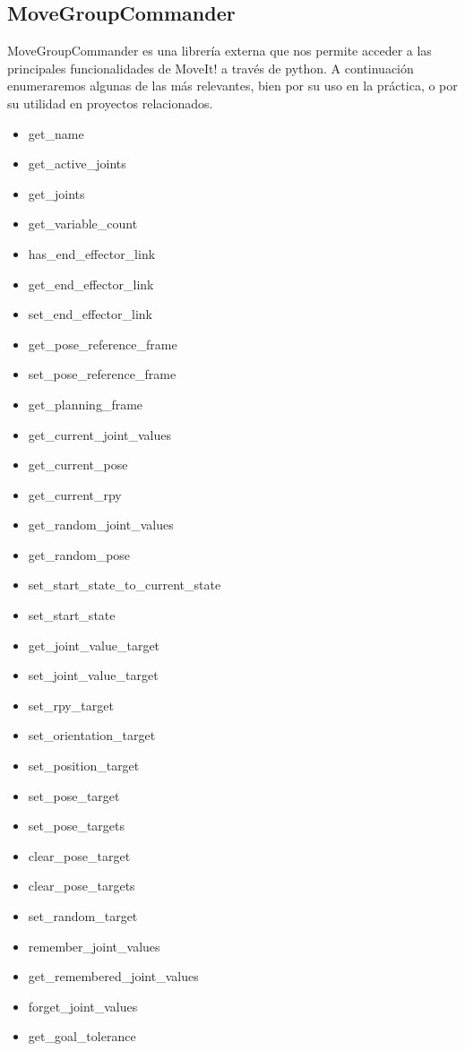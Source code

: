 \documentclass[12pt,spanish,chapterprefix, numbers=noenddot]{book}
\numberwithin{equation}{section}
\numberwithin{figure}{section}
\begin{document}
\subsection{MoveGroupCommander}
MoveGroupCommander es una librería externa que nos permite acceder a las principales funcionalidades de MoveIt! a través de python. A continuación enumeraremos algunas de las más relevantes, bien por su uso en la práctica, o por su utilidad en proyectos relacionados. 
\begin{itemize}
\item get\_name
\item get\_active\_joints
\item get\_joints
\item get\_variable\_count
\item has\_end\_effector\_link
\item get\_end\_effector\_link
\item set\_end\_effector\_link
\item get\_pose\_reference\_frame
\item set\_pose\_reference\_frame
\item get\_planning\_frame
\item get\_current\_joint\_values
\item get\_current\_pose
\item get\_current\_rpy
\item get\_random\_joint\_values
\item get\_random\_pose
\item set\_start\_state\_to\_current\_state
\item set\_start\_state
\item get\_joint\_value\_target
\item set\_joint\_value\_target
\item set\_rpy\_target
\item set\_orientation\_target
\item set\_position\_target
\item set\_pose\_target
\item set\_pose\_targets
\item clear\_pose\_target
\item clear\_pose\_targets
\item set\_random\_target
\item remember\_joint\_values
\item get\_remembered\_joint\_values
\item forget\_joint\_values
\item get\_goal\_tolerance

\end{itemize}
\end{document}
